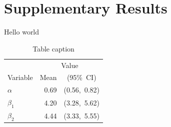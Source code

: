 \documentclass{ut-thesis}
\begin{document}
    \chapter{Supplementary Results}
    Hello world
    \begin{table}
      \centering
      \caption{Table caption}
      \begin{tabular}{lrc}
        \toprule
                  & \multicolumn{2}{c}{Value} \\
        \cmidrule(rl){2-3}
        Variable  & Mean & (95\%~CI) \\
        \midrule
        $\alpha$  & 0.69 & (0.56,~0.82) \\[1ex]
        $\beta_1$ & 4.20 & (3.28,~5.62) \\
        $\beta_2$ & 4.44 & (3.33,~5.55) \\
        \bottomrule
      \end{tabular}
    \end{table}
  \backmatter
\end{document}
